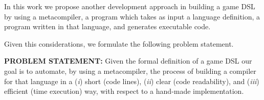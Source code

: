 In this work we propose another development approach in building a game DSL by using a metacompiler, a program which takes as input a language definition, a program written in that language, and generates executable code.

\noindent
Given this considerations, we formulate the following problem statement.

\vspace{0.5cm}
\noindent
\textbf{PROBLEM STATEMENT:}
Given the formal definition of a game DSL our goal is to automate, by using a metacompiler, the process of building a compiler for that language in a (\textit{i}) short (code lines), (\textit{ii}) clear (code readability), and (\textit{iii}) efficient (time execution) way, with respect to a hand-made implementation.